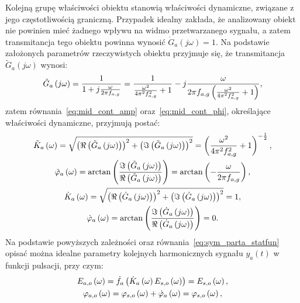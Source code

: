 Kolejną grupę właściwości obiektu stanowią właściwości dynamiczne, związane z jego częstotliwością graniczną. Przypadek idealny zakłada, że analizowany obiekt nie powinien mieć żadnego wpływu na widmo przetwarzanego sygnału, a zatem transmitancja tego obiektu powinna wynosić $\dot{G}_{a}(j\omega) = 1$. Na podstawie założonych parametrów rzeczywistych obiektu przyjmuje się, że transmitancja $\tilde{G}_{a}(j\omega)$ wynosi:
\begin{equation}
\tilde{G}_{a} \left(j\omega\right) = \frac{1}{1 + j \frac{\omega}{2 \pi f_{a,g}}} = \frac{1}{\frac{\omega^{2}}{4 \pi^{2} f_{a,g}^{2}} + 1} - j \frac{\omega}{2 \pi f_{a,g} \left( \frac{\omega^{2}}{4 \pi^{2} f_{a,g}^{2}} + 1 \right) } \label{eq:sym_parta_trans},
\end{equation}
zatem równania~\eqref{eq:mid_cont_amp} oraz~\eqref{eq:mid_cont_phi}, określające właściwości dynamiczne, przyjmują postać:
\begin{gather}
\tilde{K}_{a} \left(\omega\right) = \sqrt{\left( \Re \left( \tilde{G}_{a} \left(j\omega\right) \right) \right)^{2} + \left( \Im \left( \tilde{G}_{a} \left(j\omega\right) \right) \right)^{2}} = \left( \frac{\omega^{2}}{4 \pi^{2} f_{a,g}^{2}} + 1 \right)^{-\frac{1}{2}} \label{eq:sym_parta_amp_real}, \\
\tilde{\varphi}_{a} \left(\omega\right) = \arctan \left( \frac{\Im \left( \tilde{G}_{a} \left(j\omega\right) \right)}{\Re \left( \tilde{G}_{a} \left(j\omega\right) \right)} \right) = \arctan \left( -\frac{\omega}{2 \pi f_{a,g}} \right) \label{eq:sym_parta_phi_real}, \\
\dot{K}_{a} \left(\omega\right) = \sqrt{\left( \Re \left( \dot{G}_{a} \left(j\omega\right) \right) \right)^{2} + \left( \Im \left( \dot{G}_{a} \left(j\omega\right) \right) \right)^{2}} = 1 \label{eq:sym_parta_amp_ideal}, \\
\dot{\varphi}_{a} \left(\omega\right) = \arctan \left( \frac{\Im \left( \dot{G}_{a} \left(j\omega\right) \right)}{\Re \left( \dot{G}_{a} \left(j\omega\right) \right)} \right) = 0 \label{eq:sym_parta_phi_ideal}.
\end{gather}
Na podstawie powyższych zależności oraz równania~\eqref{eq:sym_parta_statfun} opisać można idealne parametry kolejnych harmonicznych sygnału $y_{a}(t)$ w funkcji pulsacji, przy czym:
\begin{gather}
E_{a,o} \left(\omega\right) = \dot{f}_{a} \left(\dot{K}_{a} \left(\omega\right) E_{s,o} \left(\omega\right)\right) = E_{s,o} \left(\omega\right) \label{eq:sym_parta_amp_out_ideal}, \\
\varphi_{a,o} \left(\omega\right) = \varphi_{s,o} \left(\omega\right) + \dot{\varphi}_{a} \left(\omega\right) = \varphi_{s,o} \left(\omega\right) \label{eq:sym_parta_phi_out_ideal},
\end{gather}
